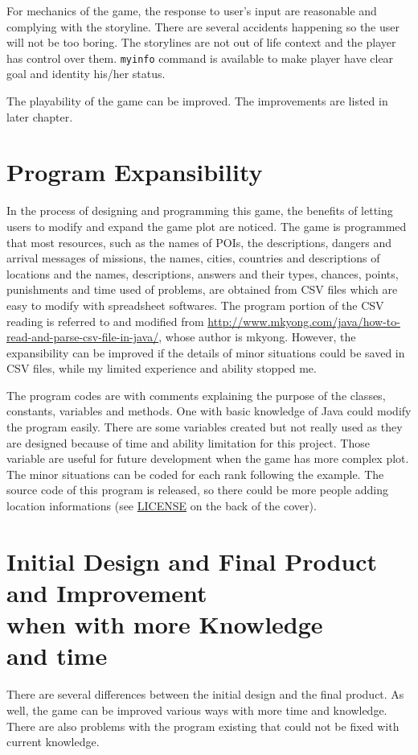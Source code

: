 \documentclass[letterpaper, 12pt]{report}
\begin{document}
For mechanics of the game, the response to user's input are reasonable and complying with the storyline. There are several accidents happening so the user will not be too boring. The storylines are not out of life context and the player has control over them. \texttt{myinfo} command is available to make player have clear goal and identity his/her status.

The playability of the game can be improved. The improvements are listed in later chapter.

\chapter{Program Expansibility}
In the process of designing and programming this game, the benefits of letting users to modify and expand the game plot are noticed. The game is programmed that most resources, such as the names of POIs, the descriptions, dangers and arrival messages of missions, the names, cities, countries and descriptions of locations and the names, descriptions, answers and their types, chances, points, punishments and time used of problems, are obtained from CSV files which are easy to modify with spreadsheet softwares. The program portion of the CSV reading is referred to and modified from \url{http://www.mkyong.com/java/how-to-read-and-parse-csv-file-in-java/}, whose author is mkyong. However, the expansibility can be improved if the details of minor situations could be saved in CSV files, while my limited experience and ability stopped me.

The program codes are with comments explaining the purpose of the classes, constants, variables and methods. One with basic knowledge of Java could modify the program easily. There are some variables created but not really used as they are designed because of time and ability limitation for this project. Those variable are useful for future development when the game has more complex plot. The minor situations can be coded for each rank following the example. The source code of this program is released, so there could be more people adding location informations (see \hyperref[chap:LICENSE]{LICENSE} on the back of the cover).

\chapter{Initial Design and Final Product\\ and Improvement\\when with more Knowledge\\and time}
There are several differences between the initial design and the final product. As well, the game can be improved various ways with more time and knowledge. There are also problems with the program existing that could not be fixed with current knowledge.
\end{document}
